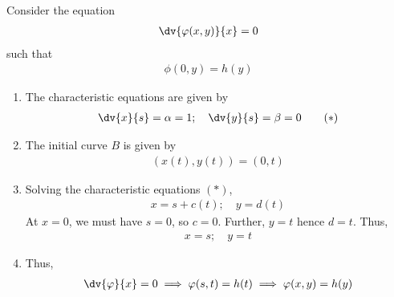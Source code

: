 \begin{example}
	Consider the equation
	\begin{align*}
		\dv{\phi(x,y)}{x} = 0
	\end{align*}
	such that
	\begin{align*}
		\phi(0,y) = h(y)
	\end{align*}

    \begin{enumerate}
        \item The characteristic equations are given by
        \begin{align*}
            \dv{x}{s} = \alpha = 1;\quad \dv{y}{s} = \beta = 0 \tag{$\ast$}
        \end{align*}
        \item The initial curve $B$ is given by
        \begin{align*}
            (x(t), y(t)) = (0,t) \tag{$\dagger$}
        \end{align*}
        \item Solving the characteristic equations $(\ast)$,
        \begin{align*}
            x = s + c(t);\quad y = d(t)
        \end{align*}
        At $x = 0$, we must have $s = 0$, so $c = 0$.
        Further, $y = t$ hence $d = t$.
        Thus,
        \begin{align*}
            x = s;\quad y = t
        \end{align*}
        \item Thus,
        \begin{align*}
            \dv{\phi}{x} = 0 \implies \phi(s,t) = h(t) \implies \phi(x,y) = h(y)
        \end{align*}
    \end{enumerate} 
\end{example}

